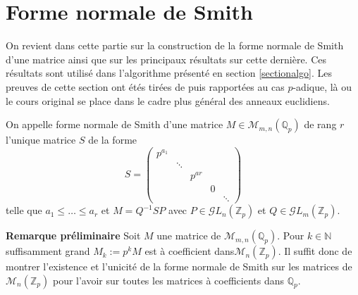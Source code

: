 \section{Forme normale de Smith}
\label{smith} 
On revient dans cette partie sur la construction de la forme normale de Smith d'une matrice ainsi que sur les principaux résultats sur cette dernière. Ces résultats sont utilisé dans l'algorithme présenté en section \ref{sectionalgo}.  Les preuves de cette section ont étés tirées de  puis rapportées au cas $p$-adique, là ou le cours original se place dans le cadre plus général des anneaux euclidiens.



\begin{rappel}
	On appelle forme normale de Smith d'une matrice $M \in \mathcal{M}_{m,n}\left(\mathbb{Q}_{p} \right) $ de rang $r$ l'unique matrice $S$ de la forme $$S =  
	\begin{pmatrix} p^{a_1} & \\
		 & \ddots \\
		 & & p^{ar}\\
		 & & & 0\\
		 & & & & \ddots \end{pmatrix} $$
		 telle que $a_1\le  \ldots\le a_r$ et $M =  Q^{-1} S P$ avec $P \in \mathcal{G}L_n\left( \mathbb{Z}_p \right) $ et $Q \in \mathcal{G}L_m\left( \mathbb{Z}_p \right) $.
\end{rappel}
\textbf{Remarque préliminaire} 
Soit $M$ une matrice de $\mathcal{M}_{m,n}\left(\mathbb{Q}_{p} \right) $. Pour $k \in \mathbb{N}$ suffisamment grand $M_k := p^k M$ est à coefficient dans$\mathcal{M}_{n}\left(\mathbb{Z}_p\right)$. Il suffit donc de montrer l'existence et l'unicité de la forme normale de Smith sur les matrices de $\mathcal{M}_{n}\left(\mathbb{Z}_p\right) $ pour l'avoir sur toutes les matrices à coefficients dans $\mathbb{Q}_{p}$.

